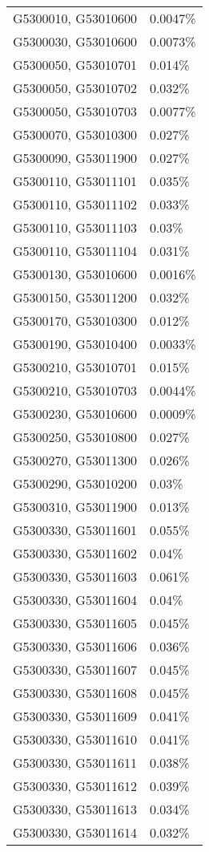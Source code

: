 \begin{longtable}[]{@{}ll@{}}
G5300010, G53010600 & 0.0047\% \\
G5300030, G53010600 & 0.0073\% \\
G5300050, G53010701 & 0.014\% \\
G5300050, G53010702 & 0.032\% \\
G5300050, G53010703 & 0.0077\% \\
G5300070, G53010300 & 0.027\% \\
G5300090, G53011900 & 0.027\% \\
G5300110, G53011101 & 0.035\% \\
G5300110, G53011102 & 0.033\% \\
G5300110, G53011103 & 0.03\% \\
G5300110, G53011104 & 0.031\% \\
G5300130, G53010600 & 0.0016\% \\
G5300150, G53011200 & 0.032\% \\
G5300170, G53010300 & 0.012\% \\
G5300190, G53010400 & 0.0033\% \\
G5300210, G53010701 & 0.015\% \\
G5300210, G53010703 & 0.0044\% \\
G5300230, G53010600 & 0.0009\% \\
G5300250, G53010800 & 0.027\% \\
G5300270, G53011300 & 0.026\% \\
G5300290, G53010200 & 0.03\% \\
G5300310, G53011900 & 0.013\% \\
G5300330, G53011601 & 0.055\% \\
G5300330, G53011602 & 0.04\% \\
G5300330, G53011603 & 0.061\% \\
G5300330, G53011604 & 0.04\% \\
G5300330, G53011605 & 0.045\% \\
G5300330, G53011606 & 0.036\% \\
G5300330, G53011607 & 0.045\% \\
G5300330, G53011608 & 0.045\% \\
G5300330, G53011609 & 0.041\% \\
G5300330, G53011610 & 0.041\% \\
G5300330, G53011611 & 0.038\% \\
G5300330, G53011612 & 0.039\% \\
G5300330, G53011613 & 0.034\% \\
G5300330, G53011614 & 0.032\% \\

\end{longtable}
